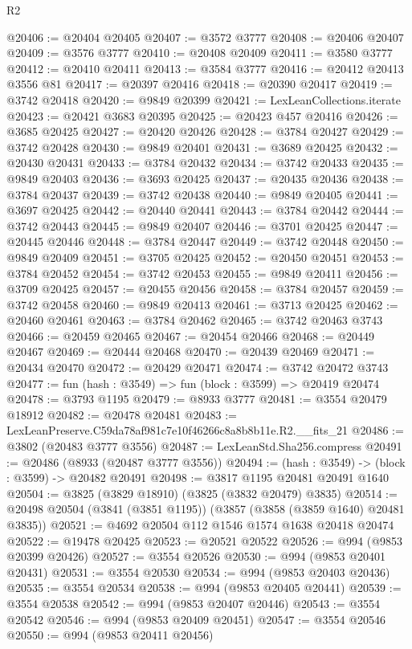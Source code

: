 \begin{lexlean}{R2}
\begin{coremodule}
@20406 := @20404 @20405
@20407 := @3572 @3777
@20408 := @20406 @20407
@20409 := @3576 @3777
@20410 := @20408 @20409
@20411 := @3580 @3777
@20412 := @20410 @20411
@20413 := @3584 @3777
@20416 := @20412 @20413 @3556 @81
@20417 := @20397 @20416
@20418 := @20390 @20417
@20419 := @3742 @20418
@20420 := @9849 @20399
@20421 := LexLeanCollections.iterate
@20423 := @20421 @3683 @20395
@20425 := @20423 @457 @20416
@20426 := @3685 @20425
@20427 := @20420 @20426
@20428 := @3784 @20427
@20429 := @3742 @20428
@20430 := @9849 @20401
@20431 := @3689 @20425
@20432 := @20430 @20431
@20433 := @3784 @20432
@20434 := @3742 @20433
@20435 := @9849 @20403
@20436 := @3693 @20425
@20437 := @20435 @20436
@20438 := @3784 @20437
@20439 := @3742 @20438
@20440 := @9849 @20405
@20441 := @3697 @20425
@20442 := @20440 @20441
@20443 := @3784 @20442
@20444 := @3742 @20443
@20445 := @9849 @20407
@20446 := @3701 @20425
@20447 := @20445 @20446
@20448 := @3784 @20447
@20449 := @3742 @20448
@20450 := @9849 @20409
@20451 := @3705 @20425
@20452 := @20450 @20451
@20453 := @3784 @20452
@20454 := @3742 @20453
@20455 := @9849 @20411
@20456 := @3709 @20425
@20457 := @20455 @20456
@20458 := @3784 @20457
@20459 := @3742 @20458
@20460 := @9849 @20413
@20461 := @3713 @20425
@20462 := @20460 @20461
@20463 := @3784 @20462
@20465 := @3742 @20463 @3743
@20466 := @20459 @20465
@20467 := @20454 @20466
@20468 := @20449 @20467
@20469 := @20444 @20468
@20470 := @20439 @20469
@20471 := @20434 @20470
@20472 := @20429 @20471
@20474 := @3742 @20472 @3743
@20477 := fun (hash : @3549) => fun (block : @3599) => @20419 @20474
@20478 := @3793 @1195
@20479 := @8933 @3777
@20481 := @3554 @20479 @18912
@20482 := @20478 @20481
@20483 := LexLeanPreserve.C59da78af981c7e10f46266c8a8b8b11e.R2.__fits_21
@20486 := @3802 (@20483 @3777 @3556)
@20487 := LexLeanStd.Sha256.compress
@20491 := @20486 (@8933 (@20487 @3777 @3556))
@20494 := (hash : @3549) -> (block : @3599) -> @20482 @20491
@20498 := @3817 @1195 @20481 @20491 @1640
@20504 := @3825 (@3829 @18910) (@3825 (@3832 @20479) @3835)
@20514 := @20498 @20504 (@3841 (@3851 @1195)) (@3857 (@3858 (@3859 @1640) @20481 @3835))
@20521 := @4692 @20504 @112 @1546 @1574 @1638 @20418 @20474
@20522 := @19478 @20425
@20523 := @20521 @20522
@20526 := @994 (@9853 @20399 @20426)
@20527 := @3554 @20526
@20530 := @994 (@9853 @20401 @20431)
@20531 := @3554 @20530
@20534 := @994 (@9853 @20403 @20436)
@20535 := @3554 @20534
@20538 := @994 (@9853 @20405 @20441)
@20539 := @3554 @20538
@20542 := @994 (@9853 @20407 @20446)
@20543 := @3554 @20542
@20546 := @994 (@9853 @20409 @20451)
@20547 := @3554 @20546
@20550 := @994 (@9853 @20411 @20456)

\end{coremodule}
\end{lexlean}
